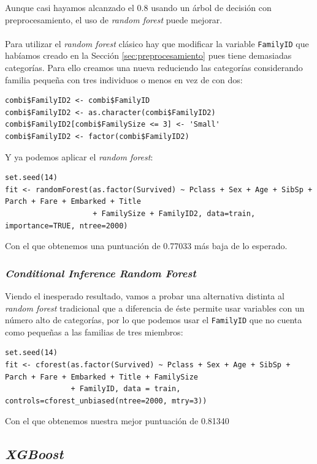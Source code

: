 Aunque casi hayamos alcanzado el 0.8 usando un árbol de decisión con preprocesamiento, el uso de \textit{random forest} puede mejorar.
\\ \\
Para utilizar el \textit{random forest} clásico hay que modificar la variable \texttt{FamilyID} que habíamos creado en la Sección \ref{sec:preprocesamiento} pues tiene demasiadas categorías. Para ello creamos una nueva reduciendo las categorías considerando familia pequeña con tres individuos o menos en vez de con dos:

\begin{lstlisting}[style=R]
combi$FamilyID2 <- combi$FamilyID
combi$FamilyID2 <- as.character(combi$FamilyID2)
combi$FamilyID2[combi$FamilySize <= 3] <- 'Small'
combi$FamilyID2 <- factor(combi$FamilyID2)
\end{lstlisting}

Y ya podemos aplicar el \textit{random forest}:

\begin{lstlisting}[style=R]
set.seed(14)
fit <- randomForest(as.factor(Survived) ~ Pclass + Sex + Age + SibSp + Parch + Fare + Embarked + Title
                    + FamilySize + FamilyID2, data=train, importance=TRUE, ntree=2000)
\end{lstlisting}

Con el que obtenemos una puntuación de 0.77033 más baja de lo esperado.

\subsubsection{\textit{Conditional Inference Random Forest}}

Viendo el inesperado resultado, vamos a probar una alternativa distinta al \textit{random forest} tradicional que a diferencia de éste permite usar variables con un número alto de categorías, por lo que podemos usar el \texttt{FamilyID} que no cuenta como pequeñas a las familias de tres miembros:

\begin{lstlisting}[style=R]
set.seed(14)
fit <- cforest(as.factor(Survived) ~ Pclass + Sex + Age + SibSp + Parch + Fare + Embarked + Title + FamilySize
               + FamilyID, data = train, controls=cforest_unbiased(ntree=2000, mtry=3)) 
\end{lstlisting}

Con el que obtenemos nuestra mejor puntuación de 0.81340

\subsection{\textit{XGBoost}}

